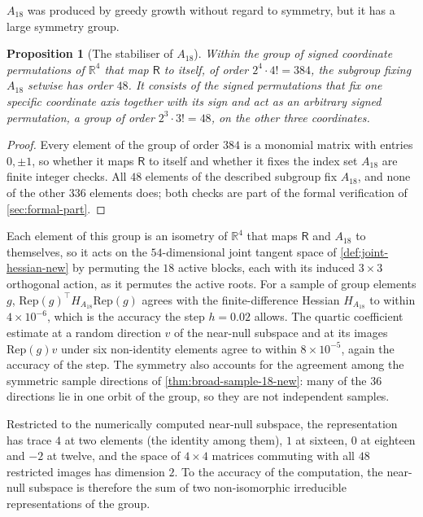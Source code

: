 \documentclass[11pt,reqno]{amsart}
\renewcommand{\_}{\origunderscore\allowbreak}
\numberwithin{equation}{section}
\theoremstyle{plain}
\newtheorem{prop}[thm]{Proposition}
\theoremstyle{definition}
\theoremstyle{remark}
\newcommand{\Rt}{\mathsf{R}}                 %
\begin{document}
$A_{18}$ was produced by greedy growth without regard to symmetry, but
it has a large symmetry group.

\begin{prop}[The stabiliser of $A_{18}$]\label{prop:a18-stabiliser}
Within the group of signed coordinate permutations of $\mathbb{R}^4$
that map $\Rt$ to itself, of order $2^4\cdot4!=384$, the subgroup fixing
$A_{18}$ setwise has order $48$. It consists of the signed permutations
that fix one specific coordinate axis together with its sign and act as
an arbitrary signed permutation, a group of order $2^3\cdot3!=48$, on
the other three coordinates.
\end{prop}

\begin{proof}
Every element of the group of order $384$ is a monomial matrix with
entries $0,\pm1$, so whether it maps $\Rt$ to itself and whether it
fixes the index set $A_{18}$ are finite integer checks. All $48$
elements of the described subgroup fix $A_{18}$, and none of the other
$336$ elements does; both checks are part of the formal verification of
\cref{sec:formal-part}.
\end{proof}

Each element of this group is an isometry of $\mathbb{R}^4$ that maps
$\Rt$ and $A_{18}$ to themselves, so it acts on the $54$-dimensional
joint tangent space of \cref{def:joint-hessian-new} by permuting the
$18$ active blocks, each with its induced $3\times3$ orthogonal action,
as it permutes the active roots. For a sample of group elements $g$,
$\mathrm{Rep}(g)^\top H_{A_{18}}\mathrm{Rep}(g)$ agrees with the
finite-difference Hessian $H_{A_{18}}$ to within $4\times10^{-6}$,
which is the accuracy the step $h=0.02$ allows. The quartic coefficient
estimate at a random direction $v$ of the near-null subspace and at its
images $\mathrm{Rep}(g)v$ under six non-identity elements agree to
within $8\times10^{-5}$, again the accuracy of the step. The symmetry
also accounts for the agreement among the symmetric sample directions of
\cref{thm:broad-sample-18-new}: many of the $36$ directions lie in one
orbit of the group, so they are not independent samples.

Restricted to the numerically computed near-null subspace, the
representation has trace $4$ at two elements (the identity among them),
$1$ at sixteen, $0$ at eighteen and $-2$ at twelve, and the space of
$4\times4$ matrices commuting with all $48$ restricted images has
dimension $2$. To the accuracy of the computation, the near-null
subspace is therefore the sum of two non-isomorphic irreducible
representations of the group.
\end{document}
